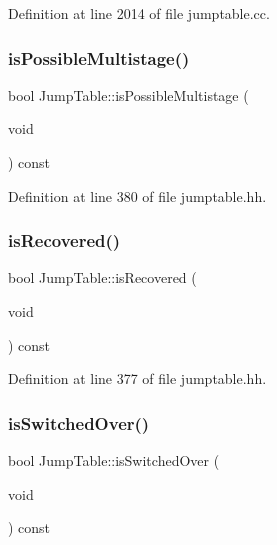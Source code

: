 Definition at line 2014 of file jumptable.\+cc.

\mbox{\label{class_jump_table_a9550d6bef76cc325b16f7b1baa829f9b}} 
\subsubsection{\texorpdfstring{isPossibleMultistage()}{isPossibleMultistage()}}
{\footnotesize\ttfamily bool Jump\+Table\+::is\+Possible\+Multistage (\begin{DoxyParamCaption}\item[{void}]{ }\end{DoxyParamCaption}) const\hspace{0.3cm}{\ttfamily [inline]}}



Definition at line 380 of file jumptable.\+hh.

\mbox{\label{class_jump_table_ab745ea6bfd38b7cdd5812d360290a570}} 
\subsubsection{\texorpdfstring{isRecovered()}{isRecovered()}}
{\footnotesize\ttfamily bool Jump\+Table\+::is\+Recovered (\begin{DoxyParamCaption}\item[{void}]{ }\end{DoxyParamCaption}) const\hspace{0.3cm}{\ttfamily [inline]}}



Definition at line 377 of file jumptable.\+hh.

\mbox{\label{class_jump_table_a667875c89b0b8c73b76c1cb09f9917d5}} 
\subsubsection{\texorpdfstring{isSwitchedOver()}{isSwitchedOver()}}
{\footnotesize\ttfamily bool Jump\+Table\+::is\+Switched\+Over (\begin{DoxyParamCaption}\item[{void}]{ }\end{DoxyParamCaption}) const\hspace{0.3cm}{\ttfamily [inline]}}




